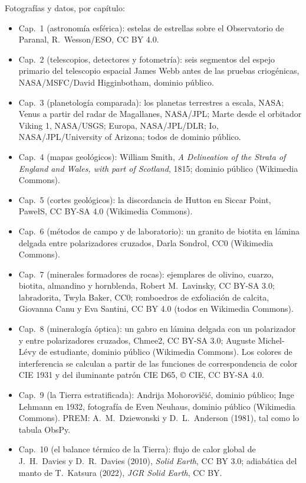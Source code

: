 \bigskip
\noindent Fotografías y datos, por capítulo:
\begin{itemize}\small
  \item Cap.~1 (astronomía esférica): estelas de estrellas sobre el Observatorio de Paranal, R.~Wesson/ESO, CC BY 4.0.
  \item Cap.~2 (telescopios, detectores y fotometría): seis segmentos del espejo primario del telescopio espacial James Webb antes de las pruebas criogénicas, NASA/MSFC/David Higginbotham, dominio público.
  \item Cap.~3 (planetología comparada): los planetas terrestres a escala, NASA; Venus a partir del radar de Magallanes, NASA/JPL; Marte desde el orbitador Viking 1, NASA/USGS; Europa, NASA/JPL/DLR; Io, NASA/JPL/University of Arizona; todos de dominio público.
  \item Cap.~4 (mapas geológicos): William Smith, \emph{A Delineation of the Strata of England and Wales, with part of Scotland}, 1815; dominio público (Wikimedia Commons).
  \item Cap.~5 (cortes geológicos): la discordancia de Hutton en Siccar Point, PawełS, CC BY-SA 4.0 (Wikimedia Commons).
  \item Cap.~6 (métodos de campo y de laboratorio): un granito de biotita en lámina delgada entre polarizadores cruzados, Darla Sondrol, CC0 (Wikimedia Commons).
  \item Cap.~7 (minerales formadores de rocas): ejemplares de olivino, cuarzo, biotita, almandino y hornblenda, Robert M.~Lavinsky, CC BY-SA 3.0; labradorita, Twyla Baker, CC0; romboedros de exfoliación de calcita, Giovanna Canu y Eva Santini, CC BY 4.0 (todos en Wikimedia Commons).
  \item Cap.~8 (mineralogía óptica): un gabro en lámina delgada con un polarizador y entre polarizadores cruzados, Chmee2, CC BY-SA 3.0; Auguste Michel-Lévy de estudiante, dominio público (Wikimedia Commons). Los colores de interferencia se calculan a partir de las funciones de correspondencia de color CIE 1931 y del iluminante patrón CIE D65, \copyright{} CIE, CC BY-SA 4.0.
  \item Cap.~9 (la Tierra estratificada): Andrija Mohorovičić, dominio público; Inge Lehmann en 1932, fotografía de Even Neuhaus, dominio público (Wikimedia Commons). PREM: A.~M.~Dziewonski y D.~L.~Anderson (1981), tal como lo tabula ObsPy.
  \item Cap.~10 (el balance térmico de la Tierra): flujo de calor global de J.~H.~Davies y D.~R.~Davies (2010), \emph{Solid Earth}, CC BY 3.0; adiabática del manto de T.~Katsura (2022), \emph{JGR Solid Earth}, CC BY.

\end{itemize}
